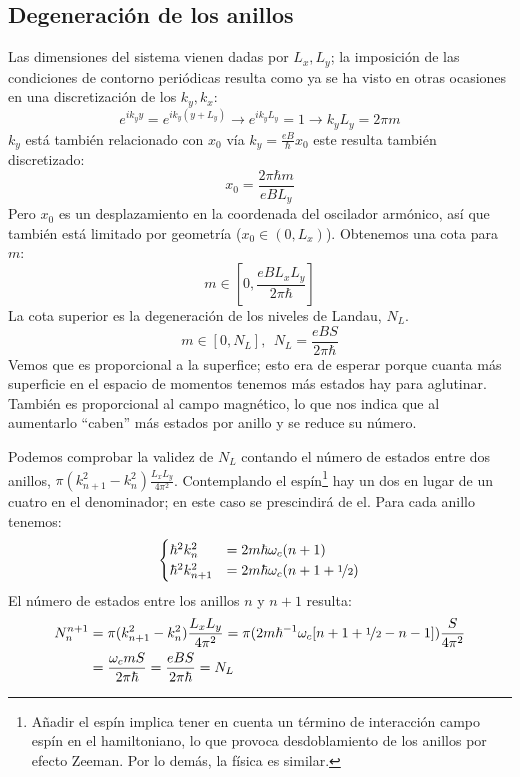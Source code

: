 \subsection{Degeneración de los anillos}
Las dimensiones del sistema vienen dadas por $L_x, L_y$; la imposición
de las condiciones de contorno periódicas resulta como ya se ha visto
en otras ocasiones en una discretización de los $k_y,k_x$:
\begin{equation}
  e^{ik_y y} =e^{ik_y
    (y+L_y)}  \rightarrow  e^{ik_y L_y} = 1  \rightarrow  k_y L_y
  = 2\pi m
\end{equation}
$k_y$ está también relacionado con $x_0$ vía $k_y = \frac{eB}{\hbar}
x_0$ este resulta también discretizado:
\begin{equation}
  x_0 = \frac{2\pi \hbar m}{eB L_y}
\end{equation}
Pero $x_0$ es un desplazamiento en la coordenada del oscilador
armónico, así que también está limitado por geometría ($x_0 \in
(0,L_x)$). Obtenemos una cota para $m$:
\begin{equation}
  m \in \left[ 0, \frac{e B L_x L_y}{2\pi \hbar} \right]
\end{equation}
La cota superior es la degeneración de los niveles de Landau,
$N_L$.
\begin{equation}
 m \in [0,N_L], \ \ N_L = \frac{eB S}{2\pi \hbar} 
\end{equation} 
Vemos que es proporcional a la superfice; esto era de esperar
porque cuanta más superficie en el espacio de momentos tenemos más
estados hay para aglutinar. También es proporcional al campo
magnético, lo que nos indica que al aumentarlo ``caben'' más estados
por anillo y se reduce su número.

\begin{boldproof}
Podemos comprobar la validez de $N_L$ contando el número de estados
entre dos anillos, $\pi(k_{n+1}^2 - k_n^2)\frac{L_x
  L_y}{4\pi^2}$. Contemplando el
espín\footnote{Añadir el espín implica tener en cuenta un término de
  interacción campo espín en el hamiltoniano, lo que provoca
  desdoblamiento de los anillos por efecto Zeeman. Por lo demás, la
  física es similar.} hay un dos en lugar de un cuatro en el
denominador; en este caso se prescindirá de el. Para cada anillo tenemos:
\begin{equation}
  \begin{cases}
    {\hbar^2 k_{n}^2}    &= 2m\hbar\omega_c (n + 1  ) \\
    {\hbar^2 k_{n+1}^2}  &= 2m\hbar\omega_c (n + 1 + \nicefrac{1}{2})
  \end{cases}
\end{equation}
El número de estados entre los anillos $n$ y $n+1$ resulta:
\begin{equation}
  \begin{split}
  N_n^{n+1} &=\pi(k_{n+1}^2 - k_n^2)\frac{L_x L_y}{4\pi^2} =  \pi (2m
  \hbar^{-1} \omega_c [n+1 + \nicefrac{1}{2} -n -1]) \frac{S}{4\pi^2}
  \\
  &= \frac{\omega_c m S}{2\pi \hbar} = \frac{eBS}{2\pi \hbar} = N_L
  \end{split}
\end{equation}
\end{boldproof}

